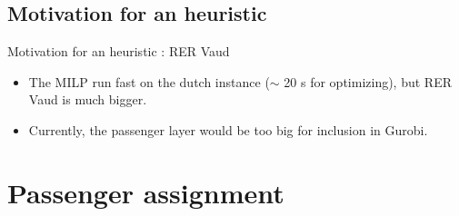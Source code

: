 \documentclass{EESD}
\begin{document}
\subsection{Motivation for an heuristic}
\begin{frame}{Motivation for an heuristic : RER Vaud}
	\begin{itemize}
		\item The MILP run fast on the dutch instance ($\sim$ 20 s for optimizing), but RER Vaud is much bigger.
		\item Currently, the passenger layer would be too big for inclusion in Gurobi.
	\end{itemize}
\end{frame}


 
\section{Passenger assignment}
\end{document}
